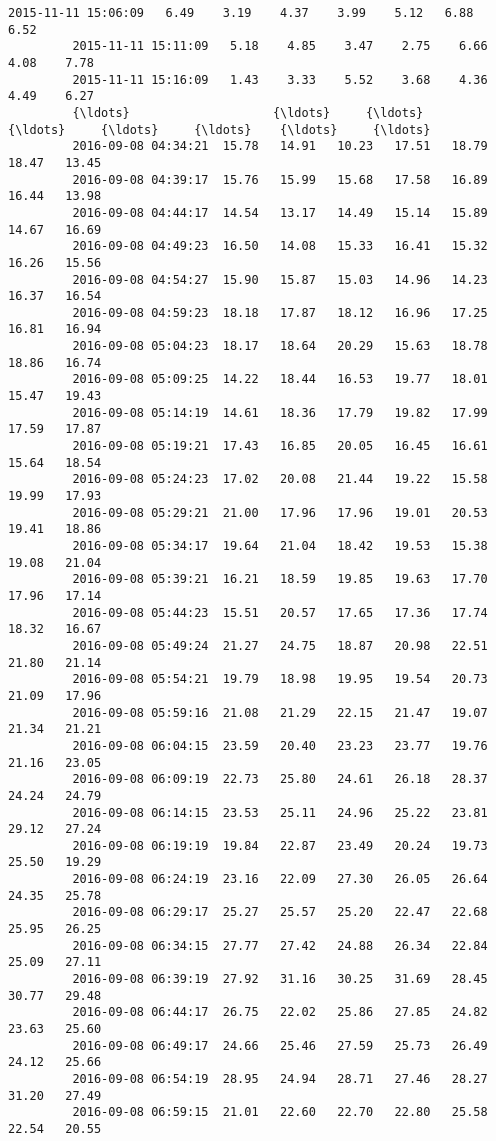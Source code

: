 \documentclass[a4paper,dvipdfmx]{jsarticle}
\begin{document}
\begin{Verbatim}[commandchars=\\\{\}]
         2015-11-11 15:06:09   6.49    3.19    4.37    3.99    5.12   6.88    6.52   
         2015-11-11 15:11:09   5.18    4.85    3.47    2.75    6.66   4.08    7.78   
         2015-11-11 15:16:09   1.43    3.33    5.52    3.68    4.36   4.49    6.27   
         {\ldots}                    {\ldots}     {\ldots}     {\ldots}     {\ldots}     {\ldots}    {\ldots}     {\ldots}   
         2016-09-08 04:34:21  15.78   14.91   10.23   17.51   18.79  18.47   13.45   
         2016-09-08 04:39:17  15.76   15.99   15.68   17.58   16.89  16.44   13.98   
         2016-09-08 04:44:17  14.54   13.17   14.49   15.14   15.89  14.67   16.69   
         2016-09-08 04:49:23  16.50   14.08   15.33   16.41   15.32  16.26   15.56   
         2016-09-08 04:54:27  15.90   15.87   15.03   14.96   14.23  16.37   16.54   
         2016-09-08 04:59:23  18.18   17.87   18.12   16.96   17.25  16.81   16.94   
         2016-09-08 05:04:23  18.17   18.64   20.29   15.63   18.78  18.86   16.74   
         2016-09-08 05:09:25  14.22   18.44   16.53   19.77   18.01  15.47   19.43   
         2016-09-08 05:14:19  14.61   18.36   17.79   19.82   17.99  17.59   17.87   
         2016-09-08 05:19:21  17.43   16.85   20.05   16.45   16.61  15.64   18.54   
         2016-09-08 05:24:23  17.02   20.08   21.44   19.22   15.58  19.99   17.93   
         2016-09-08 05:29:21  21.00   17.96   17.96   19.01   20.53  19.41   18.86   
         2016-09-08 05:34:17  19.64   21.04   18.42   19.53   15.38  19.08   21.04   
         2016-09-08 05:39:21  16.21   18.59   19.85   19.63   17.70  17.96   17.14   
         2016-09-08 05:44:23  15.51   20.57   17.65   17.36   17.74  18.32   16.67   
         2016-09-08 05:49:24  21.27   24.75   18.87   20.98   22.51  21.80   21.14   
         2016-09-08 05:54:21  19.79   18.98   19.95   19.54   20.73  21.09   17.96   
         2016-09-08 05:59:16  21.08   21.29   22.15   21.47   19.07  21.34   21.21   
         2016-09-08 06:04:15  23.59   20.40   23.23   23.77   19.76  21.16   23.05   
         2016-09-08 06:09:19  22.73   25.80   24.61   26.18   28.37  24.24   24.79   
         2016-09-08 06:14:15  23.53   25.11   24.96   25.22   23.81  29.12   27.24   
         2016-09-08 06:19:19  19.84   22.87   23.49   20.24   19.73  25.50   19.29   
         2016-09-08 06:24:19  23.16   22.09   27.30   26.05   26.64  24.35   25.78   
         2016-09-08 06:29:17  25.27   25.57   25.20   22.47   22.68  25.95   26.25   
         2016-09-08 06:34:15  27.77   27.42   24.88   26.34   22.84  25.09   27.11   
         2016-09-08 06:39:19  27.92   31.16   30.25   31.69   28.45  30.77   29.48   
         2016-09-08 06:44:17  26.75   22.02   25.86   27.85   24.82  23.63   25.60   
         2016-09-08 06:49:17  24.66   25.46   27.59   25.73   26.49  24.12   25.66   
         2016-09-08 06:54:19  28.95   24.94   28.71   27.46   28.27  31.20   27.49   
         2016-09-08 06:59:15  21.01   22.60   22.70   22.80   25.58  22.54   20.55   
         

\end{Verbatim}
\end{document}

